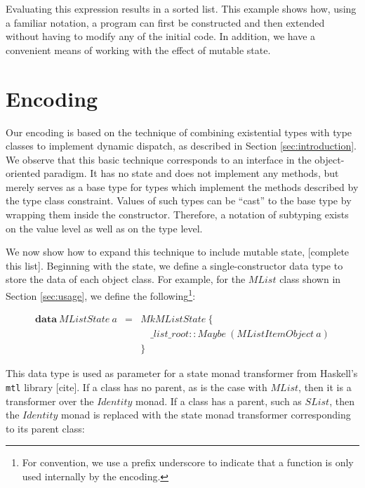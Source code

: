 \documentclass[runningheads,a4paper]{llncs}
\newcommand{\todo}[1]{[{\color{blue}#1}]}
\begin{document}
Evaluating this expression results in a sorted list. This example shows how, using a familiar notation, a program can first be constructed and then extended without having to modify any of the initial code. In addition, we have a convenient means of working with the effect of mutable state.

\section{Encoding}
\label{sec:encoding}

Our encoding is based on the technique of combining existential types with type classes to implement dynamic dispatch, as described in Section \ref{sec:introduction}. We observe that this basic technique corresponds to an interface in the object-oriented paradigm. It has no state and does not implement any methods, but merely serves as a base type for types which implement the methods described by the type class constraint. Values of such types can be ``cast'' to the base type by wrapping them inside the constructor. Therefore, a notation of subtyping exists on the value level as well as on the type level.

We now show how to expand this technique to include mutable state, \todo{complete this list}. Beginning with the state, we define a single-constructor data type to store the data of each object class. For example, for the $\mathit{MList}$ class shown in Section \ref{sec:usage}, we define the following\footnote{For convention, we use a prefix underscore to indicate that a function is only used internally by the encoding.}:

\begin{displaymath}
\begin{array}{lcl}
\mathbf{data}~\mathit{MListState}~a & = & \mathit{MkMListState}~\{\\
 && \quad \_ list \_ root :: \mathit{Maybe}~(\mathit{MListItemObject~a}) \\
 && \}
\end{array}
\end{displaymath}

This data type is used as parameter for a state monad transformer from Haskell's \texttt{mtl} library \todo{cite}. If a class has no parent, as is the case with $\mathit{MList}$, then it is a transformer over the $\mathit{Identity}$ monad. If a class has a parent, such as $\mathit{SList}$, then the $\mathit{Identity}$ monad is replaced with the state monad transformer corresponding to its parent class:
\end{document}
